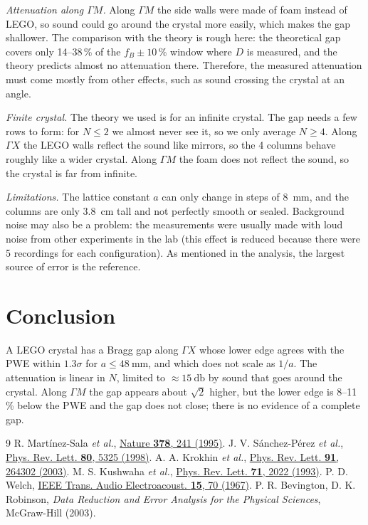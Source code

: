 \documentclass[9pt,a4paper,twocolumn]{extarticle}
\newcommand{\umm}{\milli\metre}
\newcommand{\ucm}{\centi\metre}
\newcommand{\udB}{\decibel}
\newcommand{\GX}{\ensuremath{\Gamma X}}
\newcommand{\GM}{\ensuremath{\Gamma M}}
\begin{document}
\emph{Attenuation along \GM.} Along \GM{} the side walls were made of foam instead of LEGO, so sound could go around the crystal more easily, which makes the gap shallower. The comparison with the theory is rough here: the theoretical gap covers only 14--38\,\% of the $f_B\pm10\,\%$ window where $D$ is measured, and the theory predicts almost no attenuation there. Therefore, the measured attenuation must come mostly from other effects, such as sound crossing the crystal at an angle.

\emph{Finite crystal.} The theory we used is for an infinite crystal. The gap needs a few rows to form: for $N\le2$ we almost never see it, so we only average $N\ge4$. Along \GX{} the LEGO walls reflect the sound like mirrors, so the 4 columns behave roughly like a wider crystal. Along \GM{} the foam does not reflect the sound, so the crystal is far from infinite.

\emph{Limitations.} The lattice constant $a$ can only change in steps of \SI{8}{\umm}, and the columns are only \SI{3.8}{\ucm} tall and not perfectly smooth or sealed. Background noise may also be a problem: the measurements were usually made with loud noise from other experiments in the lab (this effect is reduced because there were 5 recordings for each configuration). As mentioned in the analysis, the largest source of error is the reference.

\section{Conclusion}
A LEGO crystal has a Bragg gap along \GX{} whose lower edge agrees with the PWE within $1.3\sigma$ for $a\le\SI{48}{\umm}$, and which does not scale as $1/a$. The attenuation is linear in $N$, limited to $\approx\SI{15}{\udB}$ by sound that goes around the crystal. Along \GM{} the gap appears about $\sqrt2$ higher, but the lower edge is 8--11\,\% below the PWE and the gap does not close; there is no evidence of a complete gap.


\begin{thebibliography}{9}\footnotesize
\setlength{\itemsep}{0pt}\setlength{\parskip}{0pt}
 R. Martínez-Sala \emph{et al.}, \href{https://doi.org/10.1038/378241a0}{Nature \textbf{378}, 241 (1995)}.
 J. V. Sánchez-Pérez \emph{et al.}, \href{https://doi.org/10.1103/PhysRevLett.80.5325}{Phys. Rev. Lett. \textbf{80}, 5325 (1998)}.
 A. A. Krokhin \emph{et al.}, \href{https://doi.org/10.1103/PhysRevLett.91.264302}{Phys. Rev. Lett. \textbf{91}, 264302 (2003)}.
 M. S. Kushwaha \emph{et al.}, \href{https://doi.org/10.1103/PhysRevLett.71.2022}{Phys. Rev. Lett. \textbf{71}, 2022 (1993)}.
 P. D. Welch, \href{https://doi.org/10.1109/TAU.1967.1161901}{IEEE Trans. Audio Electroacoust. \textbf{15}, 70 (1967)}.
 P. R. Bevington, D. K. Robinson, \emph{Data Reduction and Error Analysis for the Physical Sciences}, McGraw-Hill (2003).
\end{thebibliography}
\end{document}
